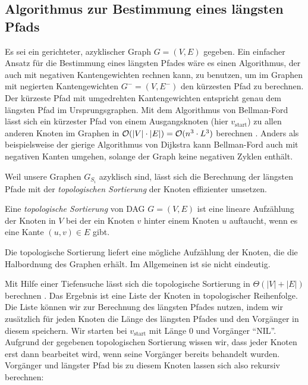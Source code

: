 \subsection{Algorithmus zur Bestimmung eines längsten Pfads}

Es sei ein gerichteter, azyklischer Graph $G = (V,E)$ gegeben. Ein einfacher Ansatz für die Bestimmung eines längsten Pfades wäre es einen Algorithmus, der auch mit negativen Kantengewichten rechnen kann, zu benutzen, um im Graphen mit negierten Kantengewichten $G^{-} = (V,E^{-})$ den kürzesten Pfad zu berechnen. Der kürzeste Pfad mit umgedrehten Kantengewichten entspricht genau dem längsten Pfad im Ursprungsgraphen. Mit dem Algorithmus von Bellman-Ford lässt sich ein kürzester Pfad von einem Ausgangsknoten (hier $v_{\mathrm{start}}$) zu allen anderen Knoten im Graphen in $\mathcal{O}(|V|\cdot |E|) = \mathcal{O}(n^3\cdot L^3)$ berechnen \cite[S.651ff.]{clrs09}. Anders als beispielsweise der gierige Algorithmus von Dijkstra kann Bellman-Ford auch mit negativen Kanten umgehen, solange der Graph keine negativen Zyklen enthält. 

Weil unsere Graphen $G_{S_i}$ azyklisch sind, lässt sich die Berechnung der längsten Pfade mit der \emph{topologischen Sortierung} der Knoten effizienter umsetzen. 

\begin{definition}
	Eine \emph{topologische Sortierung} von DAG $G = (V,E)$ ist eine lineare Aufzählung der Knoten in $V$ bei der ein Knoten $v$ hinter einem Knoten $u$ auftaucht, wenn es eine Kante $(u,v)\in E$ gibt.
\end{definition}

Die topologische Sortierung liefert eine mögliche Aufzählung der Knoten, die die Halbordnung des Graphen erhält. Im Allgemeinen ist sie nicht eindeutig.

Mit Hilfe einer Tiefensuche lässt sich die topologische Sortierung in $\Theta(|V| + |E|)$ berechnen \cite[S.612ff.]{clrs09}. Das Ergebnis ist eine Liste der Knoten in topologischer Reihenfolge. Die Liste können wir zur Berechnung des längsten Pfades nutzen, indem wir zusätzlich für jeden Knoten die Länge des längsten Pfades und den Vorgänger in diesem speichern. Wir starten bei $v_{\mathrm{start}}$ mit Länge 0 und Vorgänger \enquote{NIL}. Aufgrund der gegebenen topologischen Sortierung wissen wir, dass jeder Knoten erst dann bearbeitet wird, wenn seine Vorgänger bereits behandelt wurden. Vorgänger und längster Pfad bis zu diesem Knoten lassen sich also rekursiv berechnen:

